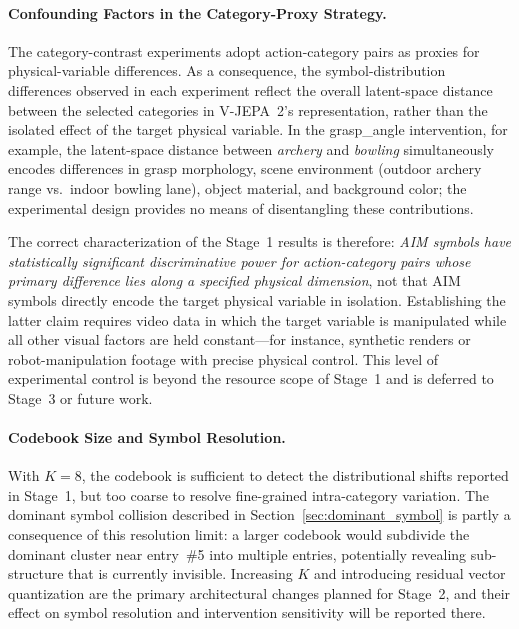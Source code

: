 \documentclass{article}
\begin{document}
\paragraph{Confounding Factors in the Category-Proxy Strategy.}
The category-contrast experiments adopt action-category pairs as proxies for
physical-variable differences.  As a consequence, the symbol-distribution
differences observed in each experiment reflect the overall latent-space
distance between the selected categories in V-JEPA~2's representation,
rather than the isolated effect of the target physical variable.  In the
grasp\_angle intervention, for example, the latent-space distance between
\textit{archery} and \textit{bowling} simultaneously encodes differences
in grasp morphology, scene environment (outdoor archery range vs.\ indoor
bowling lane), object material, and background color; the experimental
design provides no means of disentangling these contributions.

The correct characterization of the Stage~1 results is therefore:
\emph{AIM symbols have statistically significant discriminative power for
action-category pairs whose primary difference lies along a specified
physical dimension}, not that AIM symbols directly encode the target
physical variable in isolation.  Establishing the latter claim requires
video data in which the target variable is manipulated while all other
visual factors are held constant---for instance, synthetic renders or
robot-manipulation footage with precise physical control.  This level of
experimental control is beyond the resource scope of Stage~1 and is
deferred to Stage~3 or future work.

\paragraph{Codebook Size and Symbol Resolution.}
With $K = 8$, the codebook is sufficient to detect the distributional
shifts reported in Stage~1, but too coarse to resolve fine-grained
intra-category variation.  The dominant symbol collision described in
Section~\ref{sec:dominant_symbol} is partly a consequence of this resolution limit: a larger
codebook would subdivide the dominant cluster near entry~\#5 into
multiple entries, potentially revealing sub-structure that is currently
invisible.  Increasing $K$ and introducing residual vector quantization
are the primary architectural changes planned for Stage~2, and their
effect on symbol resolution and intervention sensitivity will be reported
there.
\end{document}
